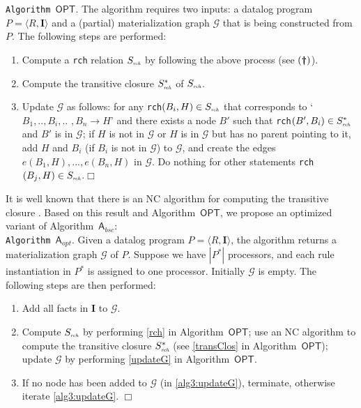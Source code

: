 \documentclass[final,1p,times]{elsarticle}
\begin{document}
\noindent\texttt{Algorithm~$\mathsf{OPT}$}. The algorithm requires two inputs:
a datalog program $P=\langle R, \textbf{I}\rangle$ and a (partial) materialization graph $\mathcal{G}$ that is
being constructed from $P$. The following steps are performed:
\begin{enumerate}[leftmargin=6ex,label=(\textbf{\roman*})]
\item Compute a \texttt{rch} relation $S_{\textit{\tiny rch}}$ by following the above process (see $(\textbf{\dag})$).\label{rch}
\item Compute the transitive closure $S^*_{\textit{\tiny rch}}$ of $S_{\textit{\tiny rch}}$.\label{transClos}
\item Update $\mathcal{G}$ as follows: for any \texttt{rch}$(B_i,H)\in S_{\textit{\tiny rch}}$
that corresponds to `$B_1,..,B_i,..$ $,B_n\rightarrow H$'
    and there exists a node $B'$ such that \texttt{rch}$(B',B_i)\in S^*_{\textit{\tiny rch}}$ and $B'$ is
    in $\mathcal{G}$; if $H$ is not in $\mathcal{G}$ or $H$ is in $\mathcal{G}$ but has no parent pointing
    to it, add $H$ and $B_i$ (if $B_i$ is not in $\mathcal{G}$) to $\mathcal{G}$, and create the edges
    $e(B_1, H),...,e(B_n, H)$ in $\mathcal{G}$. Do nothing for other statements
    \texttt{rch}$(B_j,H)\in S_{\textit{\tiny rch}}$.\label{updateG}\hfill$\Box$
\end{enumerate}

It is well known that there is an NC algorithm for computing the
transitive closure \cite{Allender07}.
Based on this result and Algorithm~$\mathsf{OPT}$, we propose an optimized variant of Algorithm~$\mathsf{A}_{bsc}$:\\

\noindent\texttt{Algorithm~$\mathsf{A}_{opt}$}. Given a datalog program $P=\langle R, \textbf{I}\rangle$, the algorithm
returns a materialization graph $\mathcal{G}$ of $P$. 
Suppose we have $|P^*|$ processors, and each rule instantiation in $P^*$ is
assigned to one processor.
Initially $\mathcal{G}$ is empty. The following steps are then performed:
\begin{enumerate}[leftmargin=8ex,label=(\textit{Step \arabic*}),ref=Step~\arabic*]
\item Add all facts in $\textbf{I}$ to $\mathcal{G}$.\label{alg3:addFacts}
\item Compute $S_{\textit{\tiny rch}}$ by performing \ref{rch} in Algorithm~$\mathsf{OPT}$; use an NC
    algorithm to compute the transitive closure $S^*_{\textit{\tiny rch}}$ (see \ref{transClos} in Algorithm~$\mathsf{OPT}$);
    update $\mathcal{G}$ by performing \ref{updateG}  in Algorithm~$\mathsf{OPT}$.\label{alg3:updateG}
\item If no node has been added to $\mathcal{G}$ (in \ref{alg3:updateG}), terminate,
    otherwise iterate \ref{alg3:updateG}. \label{alg3:halt}\hfill$\Box$
\end{enumerate}
\end{document}
